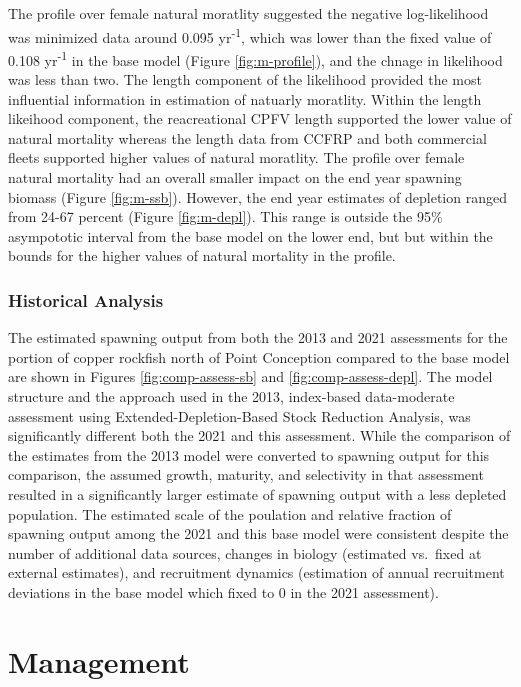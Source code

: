 \documentclass[11pt,
  english,
  letterpaper,
]{article}
\begin{document}
The profile over female natural moratlity suggested the negative log-likelihood was minimized data around 0.095 yr\textsuperscript{-1}, which was lower than the fixed value of 0.108 yr\textsuperscript{-1} in the base model (Figure \ref{fig:m-profile}), and the chnage in likelihood was less than two. The length component of the likelihood provided the most influential information in estimation of natuarly moratlity. Within the length likeihood component, the reacreational CPFV length supported the lower value of natural mortality whereas the length data from CCFRP and both commercial fleets supported higher values of natural moratlity. The profile over female natural mortality had an overall smaller impact on the end year spawning biomass (Figure \ref{fig:m-ssb}). However, the end year estimates of depletion ranged from 24-67 percent (Figure \ref{fig:m-depl}). This range is outside the 95\% asympototic interval from the base model on the lower end, but but within the bounds for the higher values of natural mortality in the profile.

\hypertarget{historical-analysis}{%
\subsubsection{Historical Analysis}\label{historical-analysis}}

The estimated spawning output from both the 2013 and 2021 assessments for the portion of copper rockfish north of Point Conception compared to the base model are shown in Figures \ref{fig:comp-assess-sb} and \ref{fig:comp-assess-depl}. The model structure and the approach used in the 2013, index-based data-moderate assessment using Extended-Depletion-Based Stock Reduction Analysis, was significantly different both the 2021 and this assessment. While the comparison of the estimates from the 2013 model were converted to spawning output for this comparison, the assumed growth, maturity, and selectivity in that assessment resulted in a significantly larger estimate of spawning output with a less depleted population. The estimated scale of the poulation and relative fraction of spawning output among the 2021 and this base model were consistent despite the number of additional data sources, changes in biology (estimated vs.~fixed at external estimates), and recruitment dynamics (estimation of annual recruitment deviations in the base model which fixed to 0 in the 2021 assessment).

\hypertarget{management}{%
\section{Management}\label{management}}
\end{document}
